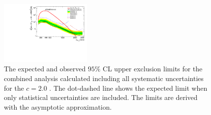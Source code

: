 \begin{figure}
\begin{center}
\includegraphics[width=0.4\textwidth,angle=-90]{figures/boosted/results/BrazilPlot_Asymptotic_g_hh_c20_combined_AllSyst_unblinded_2017-10-09.pdf}
\caption{The expected and observed $95\%$ CL upper exclusion limits for the combined analysis calculated including all systematic uncertainties for the $c=2.0$ \Grav. The dot-dashed line shows the expected limit when only statistical uncertainties are included. The limits are derived with the asymptotic approximation.}
\label{fig:limit_scalar}
\end{center}
\end{figure}
